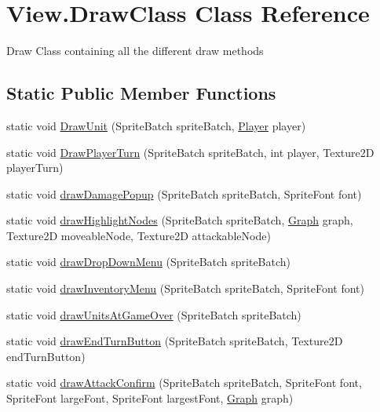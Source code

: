 \hypertarget{class_view_1_1_draw_class}{}\section{View.\+Draw\+Class Class Reference}
\label{class_view_1_1_draw_class}


Draw Class containing all the different draw methods  


\subsection*{Static Public Member Functions}
\begin{DoxyCompactItemize}
\item 
static void \hyperlink{class_view_1_1_draw_class_a5b4e02d7c968fe293c2b42b26a3b2945}{Draw\+Unit} (Sprite\+Batch sprite\+Batch, \hyperlink{class_model_1_1_player}{Player} player)
\item 
static void \hyperlink{class_view_1_1_draw_class_a15ffcf74c22681b0867d6214dab77c94}{Draw\+Player\+Turn} (Sprite\+Batch sprite\+Batch, int player, Texture2D player\+Turn)
\item 
static void \hyperlink{class_view_1_1_draw_class_ae99bdbd081b2d201780307a233bfd9d3}{draw\+Damage\+Popup} (Sprite\+Batch sprite\+Batch, Sprite\+Font font)
\item 
static void \hyperlink{class_view_1_1_draw_class_a4f65b2590cbc2d54776fb2e6e8446337}{draw\+Highlight\+Nodes} (Sprite\+Batch sprite\+Batch, \hyperlink{class_model_1_1_map_module_1_1_graph}{Graph} graph, Texture2D moveable\+Node, Texture2D attackable\+Node)
\item 
static void \hyperlink{class_view_1_1_draw_class_ae75363224d26c1de36820c77c00bab4b}{draw\+Drop\+Down\+Menu} (Sprite\+Batch sprite\+Batch)
\item 
static void \hyperlink{class_view_1_1_draw_class_a66b9b84b3e7e82180fe747a5d0ac6af4}{draw\+Inventory\+Menu} (Sprite\+Batch sprite\+Batch, Sprite\+Font font)
\item 
static void \hyperlink{class_view_1_1_draw_class_a69c3edf89c9b736bb8a9921e2e489e1a}{draw\+Units\+At\+Game\+Over} (Sprite\+Batch sprite\+Batch)
\item 
static void \hyperlink{class_view_1_1_draw_class_aadfde5664a486e1dc9581628ce98b0b6}{draw\+End\+Turn\+Button} (Sprite\+Batch sprite\+Batch, Texture2D end\+Turn\+Button)
\item 
static void \hyperlink{class_view_1_1_draw_class_a92a20fce6da929b25cd19c68f37cee03}{draw\+Attack\+Confirm} (Sprite\+Batch sprite\+Batch, Sprite\+Font font, Sprite\+Font large\+Font, Sprite\+Font largest\+Font, \hyperlink{class_model_1_1_map_module_1_1_graph}{Graph} graph)

\end{DoxyCompactItemize}
